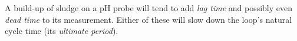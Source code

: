 





A build-up of sludge on a pH probe will tend to add {\it lag time} and possibly even {\it dead time} to its measurement.  Either of these will slow down the loop's natural cycle time (its {\it ultimate period}).










